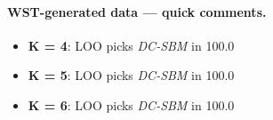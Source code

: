 \paragraph{WST-generated data — quick comments.}
\begin{itemize}
\item \textbf{K = 4}: LOO picks \emph{DC-SBM} in 100.0%
\item \textbf{K = 5}: LOO picks \emph{DC-SBM} in 100.0%
\item \textbf{K = 6}: LOO picks \emph{DC-SBM} in 100.0%
\end{itemize}

